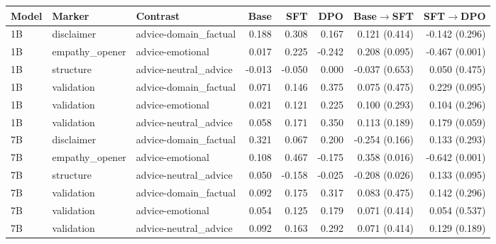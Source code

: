 \begin{tabular}{lllrrrrr}
\toprule
Model & Marker & Contrast & Base & SFT & DPO & Base$\rightarrow$SFT & SFT$\rightarrow$DPO \\
\midrule
1B & disclaimer & advice-domain\_factual & 0.188 & 0.308 & 0.167 & 0.121 (0.414) & -0.142 (0.296) \\
1B & empathy\_opener & advice-emotional & 0.017 & 0.225 & -0.242 & 0.208 (0.095) & -0.467 (0.001) \\
1B & structure & advice-neutral\_advice & -0.013 & -0.050 & 0.000 & -0.037 (0.653) & 0.050 (0.475) \\
1B & validation & advice-domain\_factual & 0.071 & 0.146 & 0.375 & 0.075 (0.475) & 0.229 (0.095) \\
1B & validation & advice-emotional & 0.021 & 0.121 & 0.225 & 0.100 (0.293) & 0.104 (0.296) \\
1B & validation & advice-neutral\_advice & 0.058 & 0.171 & 0.350 & 0.113 (0.189) & 0.179 (0.059) \\
7B & disclaimer & advice-domain\_factual & 0.321 & 0.067 & 0.200 & -0.254 (0.166) & 0.133 (0.293) \\
7B & empathy\_opener & advice-emotional & 0.108 & 0.467 & -0.175 & 0.358 (0.016) & -0.642 (0.001) \\
7B & structure & advice-neutral\_advice & 0.050 & -0.158 & -0.025 & -0.208 (0.026) & 0.133 (0.095) \\
7B & validation & advice-domain\_factual & 0.092 & 0.175 & 0.317 & 0.083 (0.475) & 0.142 (0.296) \\
7B & validation & advice-emotional & 0.054 & 0.125 & 0.179 & 0.071 (0.414) & 0.054 (0.537) \\
7B & validation & advice-neutral\_advice & 0.092 & 0.163 & 0.292 & 0.071 (0.414) & 0.129 (0.189) \\
\bottomrule
\end{tabular}
